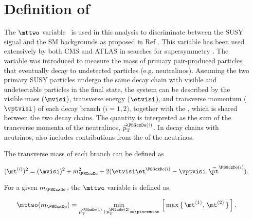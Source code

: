 \section{\texorpdfstring{Definition of \mttwo}{Definition of MT2}}
\label{sect:mt2def}
The $\mttwo$ variable~\cite{Lester:1999tx,Barr:2003rg} is used in this analysis to discriminate between the SUSY signal and the SM backgrounds as proposed in Ref \cite{Barr:2009wu}. This variable has been used extensively by both CMS and ATLAS in searches for supersymmetry \cite{Khachatryan:2015vra,Aad:2014yka}.
The variable was introduced to measure the mass of primary pair-produced  particles that eventually decay to undetected particles (e.g. neutralinos). Assuming the two primary SUSY particles undergo the same decay chain with visible and undetectable particles in the final state, the system can be described by the visible mass ($\mvisi$), transverse energy ($\etvisi$), and transverse momentum ($\vptvisi$) of each decay branch ($i=1,2$), together with the 
\ptvecmiss, which is shared between the two decay chains. The quantity \ptvecmiss is interpreted as the sum of the transverse momenta
of the neutralinos, $\vec{p}_{\rm T}^{\PSGczDo(i)}$.
In decay chains with neutrinos, \ptvecmiss also includes contributions from the \ptvec of the neutrinos.

The transverse mass of each branch can be defined as 
\begin{linenomath}
\begin{equation}
\label{eq:mtdef}
(\mt^{(i)})^{2}= (\mvisi)^2+m^2_{\PSGczDo}+2(\etvisi\et^{\PSGczDo(i)}-{\vptvisi}.\,{\vec{\pt}^{\PSGczDo(i)}}).
\end{equation}
\end{linenomath}

For a given $m_{\PSGczDo}$, the $\mttwo$ variable is defined as
\begin{linenomath}
\begin{equation}
\label{eq:mt2def}
\mttwo(m_{\PSGczDo})=\min_{\vec{p}^{\PSGczDo(1)}_{\rm T}+\vec{p}_{\rm T}^{\PSGczDo(2)}=\ptvecmiss}\,\left[\,\max\,\{ \, \mt^{(1)},\,\mt^{(2)}\,\}\,\right].
\end{equation}
\end{linenomath}

